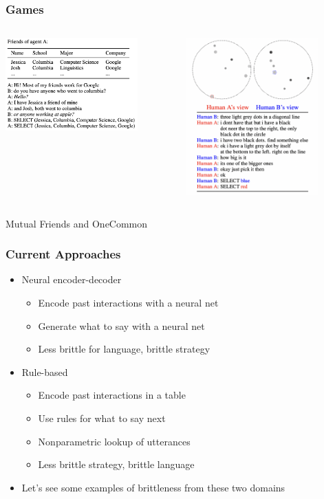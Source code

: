 \documentclass{beamer}
\begin{document}
\begin{frame}
\frametitle{Games}

\begin{columns}
\begin{column}{0.5\textwidth}
\centering
\includegraphics[width=2in]{img/mf.png}
\end{column}
\begin{column}{0.5\textwidth}
\centering
\includegraphics[width=2in]{img/oc.png}
\end{column}
\end{columns}

\vspace{2em}
\centering
Mutual Friends and OneCommon
\end{frame}

\begin{frame}
\frametitle{Current Approaches}
\begin{itemize}
\item Neural encoder-decoder
    \begin{itemize}
    \item Encode past interactions with a neural net
    \item Generate what to say with a neural net
    \item Less brittle for language, brittle strategy
    \end{itemize}
\item Rule-based
    \begin{itemize}
    \item Encode past interactions in a table
    \item Use rules for what to say next
    \item Nonparametric lookup of utterances
    \item Less brittle strategy, brittle language
    \end{itemize}
\item Let's see some examples of brittleness
    from these two domains
\end{itemize}
\end{frame}
\end{document}
